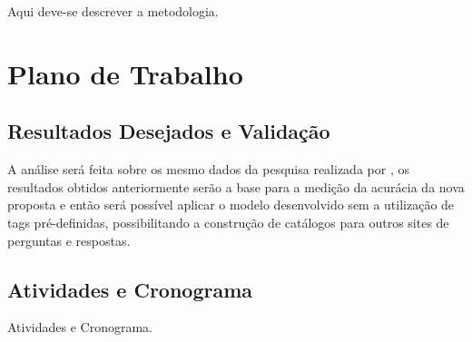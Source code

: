 \documentclass[10pt,a4paper,final]{article}
\begin{document}
Aqui deve-se descrever a metodologia.



  
    \section{Plano de Trabalho}



    \subsection{Resultados Desejados e Validação}
    
A análise será feita sobre os mesmo dados da pesquisa realizada por \cite{Arash2016}, os resultados obtidos anteriormente serão a base para a medição da acurácia da nova proposta e então será possível aplicar o modelo desenvolvido sem a utilização de tags pré-definidas, possibilitando a construção de catálogos para outros sites de perguntas e respostas.
 
    \subsection{Atividades e Cronograma}
    
Atividades e Cronograma.



\nocite{Joorabchi2015}
\nocite{Manning2009}
\nocite{Mihalcea2007}
\nocite{Mihalcea2001}
\nocite{Mihalcea2004}
\nocite{Miotto2013}
\nocite{Posch2014}
\nocite{Roul2015}
\nocite{Udell2005}
\nocite{Kaleta2014}

{}  


    
\end{document}
